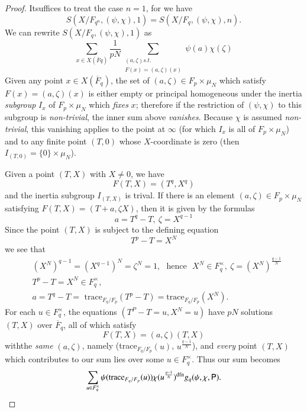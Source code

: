 \begin{proof}
It\pageoriginale suffices to treat the case $n=1$, for we have
$$
S(X/F_{q^{n}},(\psi,\chi),1)=S(X/F_{q},(\psi,\chi),n).
$$
We can rewrite $S(X/F_{q},(\psi,\chi),1)$ as
$$
\sum\limits_{x\in X(\overline{F}q)}\frac{1}{pN}\sum\limits_{\substack{(a,\zeta)s.t.\\ F(x)=(a,\zeta)(x)}}\psi(a)\chi(\zeta)
$$
Given any point $x\in X(\overline{F}_{q})$, the set of $(a,\zeta)\in F_{p}\times \mu_{N}$ which satisfy $F(x)=(a,\zeta)(x)$ is either empty or principal homogeneous under the inertia {\em subgroup} $I_{x}$ of $F_{p}\times \mu_{N}$ which {\em fixes} $x$; therefore if the restriction of $(\psi,\chi)$ to this subgroup is {\em non-trivial}, the inner sum above {\em vanishes}. Because $\chi$ is assumed {\em non-trivial}, this vanishing applies to the point at $\infty$ (for which $I_{x}$ is all of $F_{p}\times \mu_{N}$) and to any finite point $(T,0)$ whose $X$-coordinate is zero (then $I_{(T,0)}=\{0\}\times \mu_{N}$).

Given a point $(T,X)$ with $X\neq 0$, we have
$$
F(T,X)=(T^{q},X^{q})
$$
and the inertia subgroup $I_{(T,X)}$ is trival. If there is an element $(a,\zeta)\in F_{p}\times \mu_{N}$ satisfying $F(T,X)=(T+a,\zeta X)$, then it is given by the formulas
$$
a=T^{q}-T, \ \zeta=X^{q-1}
$$
Since the point $(T,X)$ is subject to the defining equation
$$
T^{p}-T=X^{N}
$$
we see that
\begin{align*}
& (X^{N})^{q-1}=(X^{q-1})^{N}=\zeta^{N}=1,\text{~ hence~ } X^{N}\in F^{\times}_{q}, \ \zeta=(X^{N})^{\frac{q-1}{N}}\\[3pt]
& T^{p}-T=X^{N}\in F^{\times}_{q},\\[3pt]
& a=T^{q}-T=\text{~trace}_{F_{q}/F_{p}}(T^{p}-T)=\text{trace}_{F_{q}/F_{p}}(X^{N}).
\end{align*}
For each $u\in F^{\times}_{q}$, the equations $(T^{P}-T=u,X^{N}=u)$ have $pN$ solutions $(T,X)$ over $\overline{F}_{q}$, all of which satisfy
$$
F(T,X)=(a,\zeta)(T,X)
$$
with\pageoriginale the {\em same} $(a,\zeta)$, namely (trace$_{F_{q}/F_{p}}(u)$, $u^{\frac{q-1}{N}}$), and {\em every} point $(T,X)$ which contributes to our sum lies over some $u\in F^{\times}_{q}$. Thus our sum becomes
$$
\sum\limits_{u\in F^{\times}_{q}}\psi(\text{trace}_{F_{q}/F_{p}}(u))\chi(u^{\frac{q-1}{N}})^{\text{dfn}}g_{q}(\psi,\chi,\mathsf{P}).
$$
\end{proof}


